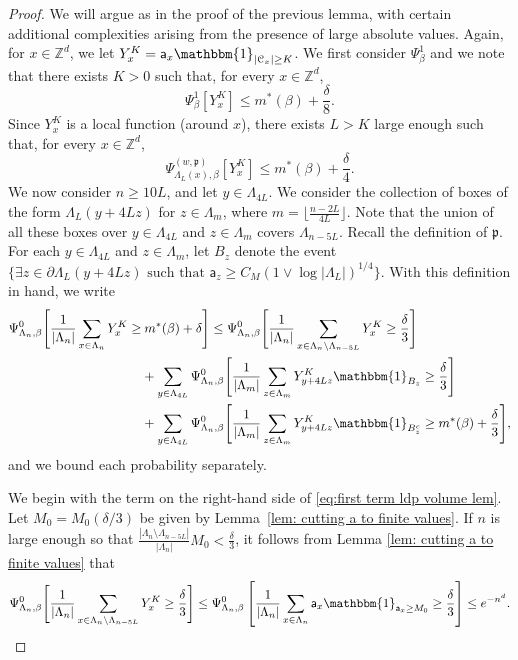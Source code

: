 \documentclass[11pt,a4paper]{article}
\theoremstyle{definition}
\numberwithin{equation}{section}
\begin{document}
\begin{proof}
We will argue as in the proof of the previous lemma, with certain additional complexities arising from the presence of large absolute values. Again, for $x\in \mathbb Z^d$, we let $Y_x^K=\mathsf{a}_x\mathbbm{1}_{|\mathcal{C}_x|\geq K}$. We first consider $\Psi^1_{\beta}$ and we note that there exists $K>0$ such that, for every $x\in \mathbb Z^d$,    
\begin{equation}
\Psi^1_{\beta}[Y_x^K]\leq m^*(\beta)+\frac{\delta}{8}.    
\end{equation}
Since $Y_x^K$ is a local function (around $x$), there exists $L> K$ large enough such that, for every $x\in \mathbb Z^d$,
\begin{equation}\label{eq: y smaller m}
\Psi^{(w,\mathfrak{p})}_{\Lambda_L(x),\beta}[Y_x^K]\leq m^*(\beta)+\frac{\delta}{4}. 
\end{equation}
We now consider $n\geq 10L$, and let $y\in \Lambda_{4L}$. We consider the collection of boxes of the form $\Lambda_L(y+4Lz)$ for $z\in \Lambda_m$, where $m=\lfloor \frac{n-2L}{4L}\rfloor$. Note that the union of all these boxes over $y\in \Lambda_{4L}$ and $z\in \Lambda_m$ covers $\Lambda_{n-5L}$. Recall the definition of $\mathfrak{p}$. For each $y\in \Lambda_{4L}$ and $z\in \Lambda_m$, let $B_{z}$ denote the event $\{\exists z\in \partial \Lambda_L(y+4Lz) \text{ such that } \mathsf{a}_z\geq C_{M} (1\vee\log |\Lambda_L|)^{1/4}\}$. With this definition in hand, we write 
\begin{align}
\Psi^0_{\Lambda_n,\beta}\Bigg[ \frac{1}{|\Lambda_n|} \sum_{
x\in \Lambda_n}Y_x^K\geq &\:m^*(\beta) + \delta\Bigg]\leq
\Psi^0_{\Lambda_n,\beta}\Bigg[ \frac{1}{|\Lambda_n|} \sum_{
x\in \Lambda_n\setminus\Lambda_{n-5L}} Y_{x}^K \geq \frac{\delta}{3}\Bigg]\label{eq:first term ldp volume lem}
\\&+
\sum_{y\in \Lambda_{4L}}\Psi^0_{\Lambda_n,\beta}\Bigg[ \frac{1}{|\Lambda_m|} \sum_{
z\in \Lambda_m}Y_{y+4Lz}^K \mathbbm{1}_{B_z}\geq \frac{\delta}{3}\Bigg]\label{eq:second term ldp volume lem}\\&+\sum_{y\in \Lambda_{4L}}\Psi^0_{\Lambda_n,\beta}\Bigg[ \frac{1}{|\Lambda_m|} \sum_{
z\in \Lambda_m}Y_{y+4Lz}^K \mathbbm{1}_{B_z^c}\geq m^*(\beta)  + \frac{\delta}{3}\Bigg],\label{eq:third term ldp volume lem}
\end{align}
and we bound each probability separately.

We begin with the term on the right-hand side of \eqref{eq:first term ldp volume lem}. Let $M_0=M_0(\delta/3)$ be given by Lemma~\ref{lem: cutting a to finite values}. If $n$ is large enough so that $\tfrac{|\Lambda_n\setminus\Lambda_{n-5L}|}{|\Lambda_n|}M_0<\tfrac{\delta}{3}$, it follows from Lemma \ref{lem: cutting a to finite values} that
\begin{equation}\label{eq:boundterm1}
\Psi^0_{\Lambda_n,\beta}\Bigg[ \frac{1}{|\Lambda_n|} \sum_{
x\in \Lambda_n\setminus\Lambda_{n-5L}} Y_{x}^K \geq \frac{\delta}{3}\Bigg]\leq \Psi^0_{\Lambda_n,\beta}\left[\frac{1}{|\Lambda_n|}\sum_{x\in \Lambda_n}\mathsf{a}_x\mathbbm{1}_{\mathsf{a}_x\geq M_0}\geq \frac{\delta}{3}\right]\leq e^{-n^d}.    
\end{equation}


\end{proof}
\end{document}

